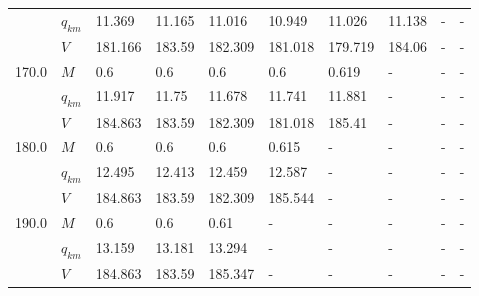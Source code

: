 \begin{tabular}{|l|l|llllllll|}
      & $q_{km}$ &                    11.369 &                   11.165 &                    11.016 &   10.949\cellcolor{green} &                    11.026 &   11.138 &                         - &                         - \\
      & $V$ &                   181.166 &                   183.59 &                   182.309 &  181.018\cellcolor{green} &                   179.719 &   184.06 &                         - &                         - \\
\hline
170.0 & $M$ &                       0.6 &                      0.6 &      0.6\cellcolor{green} &                       0.6 &                     0.619 &        - &                         - &                         - \\
      & $q_{km}$ &                    11.917 &                    11.75 &   11.678\cellcolor{green} &                    11.741 &                    11.881 &        - &                         - &                         - \\
      & $V$ &                   184.863 &                   183.59 &  182.309\cellcolor{green} &                   181.018 &                    185.41 &        - &                         - &                         - \\
\hline
180.0 & $M$ &                       0.6 &     0.6\cellcolor{green} &                       0.6 &                     0.615 &                         - &        - &                         - &                         - \\
      & $q_{km}$ &                    12.495 &  12.413\cellcolor{green} &                    12.459 &                    12.587 &                         - &        - &                         - &                         - \\
      & $V$ &                   184.863 &  183.59\cellcolor{green} &                   182.309 &                   185.544 &                         - &        - &                         - &                         - \\
\hline
190.0 & $M$ &      0.6\cellcolor{green} &                      0.6 &                      0.61 &                         - &                         - &        - &                         - &                         - \\
      & $q_{km}$ &   13.159\cellcolor{green} &                   13.181 &                    13.294 &                         - &                         - &        - &                         - &                         - \\
      & $V$ &  184.863\cellcolor{green} &                   183.59 &                   185.347 &                         - &                         - &        - &                         - &                         - \\
\hline
\end{tabular}